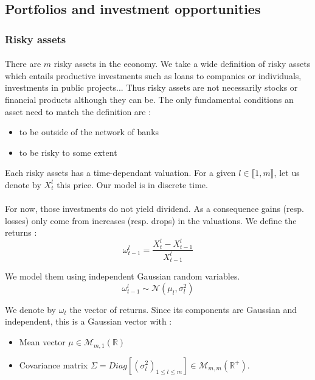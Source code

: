 \documentclass{article}
\begin{document}
\subsection{Portfolios and investment opportunities}\label{portfolio and investment opportunities}

\subsubsection{Risky assets}

\paragraph{}
There are $m$ risky assets in the economy. We take a wide definition of risky assets which entails productive investments such as loans to companies or individuals, investments in public projects... Thus risky assets are not necessarily stocks or financial products although they can be. The only fundamental conditions an asset need to match the definition are :
\begin{itemize}
    \item to be outside of the network of banks
    \item to be risky to some extent
\end{itemize}

Each risky assets has a time-dependant valuation. For a given $l \in \llbracket 1, m \rrbracket $, let us denote by $X_t^l$ this price. Our model is in discrete time.

\paragraph{}
For now, those investments do not yield dividend. As a consequence gains (resp. losses) only come from increases (resp. drops) in the valuations. We define the returns : 
$$\omega_{t-1}^l = \frac{X_t^l - X_{t-1}^l}{X_{t-1}^l}$$

We model them using independent Gaussian random variables.
    $$\omega_{t-1}^l \sim \mathcal{N}(\mu_l, \sigma_l^2)$$
    
We denote by $\omega_t$ the vector of returns. Since its components are Gaussian and independent, this is a Gaussian vector with :
    \begin{itemize}
        \item Mean vector $\mu \in \mathcal{M}_{m, 1}(\mathbb{R})$
        \item Covariance matrix $\Sigma = Diag[(\sigma_l^2)_{1\leq l \leq m}] \in \mathcal{M}_{m, m}(\mathbb{R}^+)$.
    \end{itemize}
    
\end{document}
